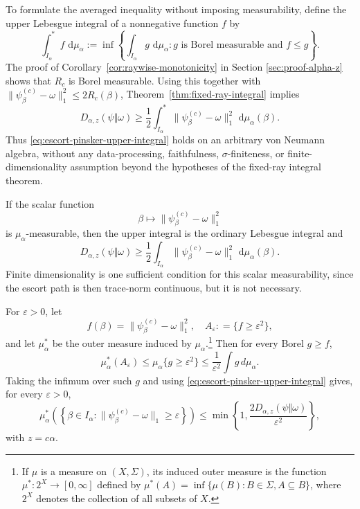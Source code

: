 \documentclass[12pt]{article}
\numberwithin{equation}{section}
\theoremstyle{definition}
\theoremstyle{remark}
\newcommand{\dd}{\,\mathrm d}
\newcommand{\?}{\overset{?}{=}}
\newcommand{\defeq}{\mathrel{\mathop:}=}
\begin{document}
To formulate the averaged inequality without imposing measurability, define the upper Lebesgue integral of a nonnegative function
\(f\) by
\begin{equation}
  \int_{I_\alpha}^{*} f\,\dd\mu_\alpha
  :=
  \inf\left\{
    \int_{I_\alpha}g\,\dd\mu_\alpha:
    g\text{ is Borel measurable and }f\leq g
  \right\}.
  \label{eq:upper-lebesgue-integral}
\end{equation}
The proof of Corollary~\ref{cor:raywise-monotonicity} in Section \ref{sec:proof-alpha-z} shows that $R_c$ is
Borel measurable.
Using this together with
\(\|\psi_\beta^{(c)}-\omega\|_1^2\leq2R_c(\beta)\),
Theorem~\ref{thm:fixed-ray-integral} implies
\begin{equation}
  D_{\alpha,z}(\psi\Vert\omega)
  \geq
  \frac12
  \int_{I_\alpha}^{*}
    \|\psi_\beta^{(c)}-\omega\|_1^2
    \,\dd\mu_\alpha(\beta).
  \label{eq:escort-pinsker-upper-integral}
\end{equation}
Thus \eqref{eq:escort-pinsker-upper-integral} holds on an arbitrary von
Neumann algebra, without any data-processing, faithfulness,
\(\sigma\)-finiteness, or finite-dimensionality assumption beyond the
hypotheses of the fixed-ray integral theorem.

If the scalar function
\[
  \beta\longmapsto
  \|\psi_\beta^{(c)}-\omega\|_1^2
\]
is \(\mu_\alpha\)-measurable, then the upper integral is the ordinary
Lebesgue integral and
\begin{equation}
  D_{\alpha,z}(\psi\Vert\omega)
  \geq
  \frac12
  \int_{I_\alpha}
    \|\psi_\beta^{(c)}-\omega\|_1^2
    \,\dd\mu_\alpha(\beta).
  \label{eq:escort-pinsker-ordinary}
\end{equation}
Finite dimensionality is one sufficient condition for this scalar
measurability, since the escort path is then trace-norm continuous, but it
is not necessary.

For $\varepsilon>0$, let
\begin{equation}
  f(\beta)= \|\psi_\beta^{(c)}-\omega\|_1^2, \quad A_\varepsilon  \defeq \{f\geq \varepsilon^2\},
\end{equation}
and let $\mu_\alpha^*$ be the outer measure induced by $\mu_\alpha$.\footnote{If $\mu$ is a measure on $(X,\Sigma)$, its induced outer measure is the function $\mu^*:2^X\to[0,\infty]$ defined by $\mu^*(A)=\inf\{\mu(B):B\in\Sigma,A\subseteq B\}$, where $2^X$ denotes the collection of all subsets of $X$.}
Then for every Borel $g\geq f$,
\begin{equation}
    \mu_\alpha^*(A_\varepsilon)\leq \mu_\alpha\{g\geq \varepsilon^2\}\leq \frac{1}{\varepsilon^2} \int g \, d\mu_\alpha.
\end{equation}
Taking the infimum over such $g$ and using \eqref{eq:escort-pinsker-upper-integral} gives, for every \(\varepsilon>0\),
\begin{equation}
  \mu_\alpha^*\!\left(
    \left\{\beta\in I_\alpha:
      \|\psi_\beta^{(c)}-\omega\|_1\geq\varepsilon
    \right\}
  \right)
  \leq
  \min\left\{
    1,\frac{2D_{\alpha,z}(\psi\Vert\omega)}{\varepsilon^2}
  \right\},
  \label{eq:escort-concentration}
\end{equation}
with $z=c\alpha$.
\end{document}
